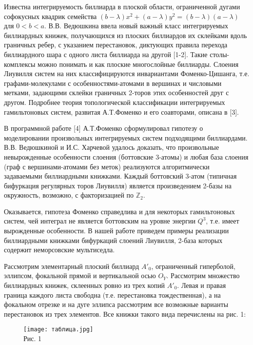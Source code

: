 \documentclass{vzmsthesis}
\begin{document}

\vzmscaption


Известна интегрируемость биллиарда в плоской области, ограниченной дугами софокусных квадрик семейства $(b-\lambda)x^2+(a-\lambda)y^2=(b-\lambda)(a-\lambda)$ для $0<b<a$. В.В. Ведюшкина ввела новый важный класс интегрируемых биллиардных книжек, получающихся из плоских биллиардов их склейками вдоль граничных ребер, с указанием перестановок, диктующих правила перехода биллиардного шара с одного листа биллиарда на другой [1-2]. Такие столы-комплексы можно понимать и как плоские многослойные биллиарды. Слоения Лиувилля систем на них классифицируются инвариантами Фоменко-Цишанга, т.е. графами-молекулами с особенностями-атомами в вершинах и числовыми метками, задающими склейки граничных 2-торов этих особенностей друг с другом. Подробнее теория топологической классификации интегрируемых гамильтоновых систем, развитая А.Т.Фоменко и его соавторами, описана в [3].

В программной работе [4] А.Т.Фоменко сформулировал гипотезу о моделировании произвольных интегрируемых систем подходящими биллиардами. В.В. Ведюшкиной и И.С. Харчевой удалось доказать, что произвольные невырожденные особенности слоения (боттовские 3-атомы) и любая база слоения (граф с вершинами-атомами без меток) реализуются алгоритмически задаваемыми биллиардными книжками. Каждый боттовский 3-атом (типичная бифуркация регулярных торов Лиувилля) является произведением 2-базы на окружность, возможно, с факторизацией по $\mathbb{Z}_2$.

Оказывается, гипотеза Фоменко справедлива и для некоторых гамильтоновых систем, чей интеграл не является боттовским на уровне энергии $Q^3$, т.е. имеет вырожденные особенности. В нашей работе приведем примеры реализации биллиардными книжками бифуркаций слоений Лиувилля, 2-база которых содержит неморсовские мультиседла.

Рассмотрим элементарный плоский биллиард $A'_{0}$, ограниченный гиперболой, эллипсом, фокальной прямой и вертикальной осью $O_{Y}$. 
Рассмотрим множество биллиардных книжек, склеенных ровно из трех копий $A'_{0}$. Левая и правая граница каждого листа свободна (т.е. перестановка тождественная), а на фокальном отрезке и на дуге эллипса рассмотрим все возможные варианты перестановок из трех элементов. Все книжки такого вида перечислены на рис. 1:
\vspace*{-0.4cm} 
\begin{figure}[h!]
	\begin{center}
	\texttt{[image: таблица.jpg]}\\
	Рис. 1
	\end{center}
\end{figure}
\vspace*{-1.1cm}\\
\end{document}
